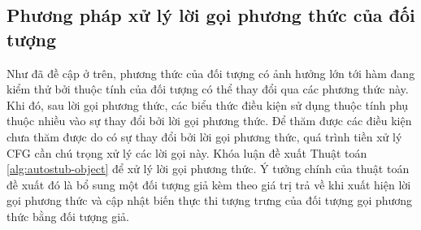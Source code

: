 \subsection{Phương pháp xử lý lời gọi phương thức của đối tượng} \label{sec:autostub-obj}
Như đã đề cập ở trên, phương thức của đối tượng có ảnh hưởng lớn tới hàm đang kiểm thử bởi thuộc tính của đối tượng có thể thay đổi qua các phương thức này. Khi đó, sau lời gọi phương thức, các biểu thức điều kiện sử dụng thuộc tính phụ thuộc nhiều vào sự thay đổi bởi lời gọi phương thức. Để thăm được các điều kiện chưa thăm được do có sự thay đổi bởi lời gọi phương thức, quá trình tiền xử lý CFG cần chú trọng xử lý các lời gọi này. Khóa luận đề xuất Thuật toán \ref{alg:autostub-object} để xử lý lời gọi phương thức. Ý tưởng chính của thuật toán đề xuất đó là bổ sung một đối tượng giả kèm theo giá trị trả về khi xuất hiện lời gọi phương thức và cập nhật biến thực thi tượng trưng của đối tượng gọi phương thức bằng đối tượng giả. 

